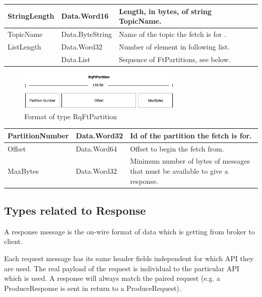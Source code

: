 \begin{table}[H]
\centering
\begin{tabular}{ l  l  p{10cm} }
\hline
StringLength      & Data.Word16     & Length, in bytes, of string TopicName.              \\ \hline
TopicName         & Data.ByteString & Name of the topic the fetch is for . \\ \hline
ListLength        & Data.Word32     & Number of element in following list.                \\ \hline
[FtPartition]     & Data.List       & Sequence of FtPartitions, see below.                \\ \hline
\end{tabular}
\end{table}

\begin{figure}[H]
    \centering
    \includegraphics[width=0.7\textwidth]{images/impl-prot-types-ftPartition.png}
    \caption{Format of type RqFtPartition }
    \label{fig:impl-prot-types-ftPartition}
\end{figure}

\begin{table}[H]
\centering
\begin{tabular}{ l  l  p{10cm} }
\hline
PartitionNumber & Data.Word32 & Id of the partition the fetch is for.                                          \\ \hline
Offset          & Data.Word64 & Offset to begin the fetch from.                                                \\ \hline
MaxBytes        & Data.Word32 & Minimum number of bytes of messages that must be available to give a response. \\ \hline
\end{tabular}
\end{table}

\subsection{Types related to Response}
A response message is the on-wire format of data which is getting from broker to
client.

Each request message has its same header fields independent for which API they are used. 
The real payload of the request is individual to the particular API which is
used. A response will always match the paired request (e.g. a ProduceResponse is
sent in return to a ProduceRequest).


